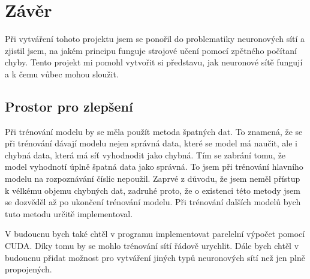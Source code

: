 \section{Závěr}
Při vytváření tohoto projektu jsem se ponořil do problematiky neuronových sítí a zjistil jsem, na jakém principu funguje strojové učení pomocí zpětného počítaní chyby.
Tento projekt mi pomohl vytvořit si představu, jak neuronové sítě fungují a k čemu vůbec mohou sloužit.

\subsection{Prostor pro zlepšení}
Při trénování modelu by se měla použít metoda špatných dat. To znamená, že se při trénování dávají modelu nejen správná data,
které se model má naučit, ale i chybná data, která má síť vyhodnodit jako chybná. Tím se zabrání tomu, že model vyhodnotí úplně špatná data jako správná.
To jsem při trénování hlavního modelu na rozpoznávání číslic nepoužil.
Zaprvé z důvodu, že jsem neměl přístup k vélkému objemu chybných dat, zadruhé proto, že o existenci této metody jsem se dozvěděl až po ukončení trénování modelu.
Při trénování dalších modelů bych tuto metodu určitě implementoval.

V budoucnu bych také chtěl v programu implementovat parelelní výpočet pomocí CUDA. Díky tomu by se mohlo trénování sítí řádově urychlit.
Dále bych chtěl v budoucnu přidat možnost pro vytváření jiných typů neuronových sítí než jen plně propojených.